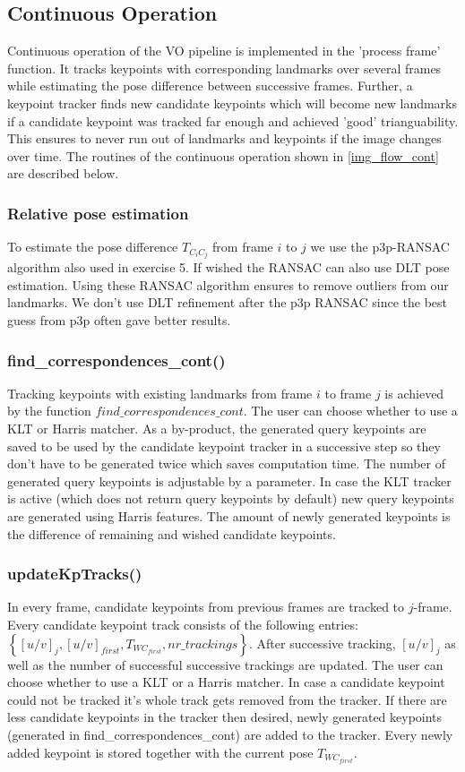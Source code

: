 \subsection{Continuous Operation}
\label{sec_cont_op}
Continuous operation of the VO pipeline is implemented in the 'process frame' function. It tracks keypoints with corresponding landmarks over several frames while estimating the pose difference between successive frames. Further, a keypoint tracker finds new candidate keypoints which will become new landmarks if a candidate keypoint was tracked far enough and achieved 'good' trianguability. This ensures to never run out of landmarks and keypoints if the image changes over time. The routines of the continuous operation shown in \cref{img_flow_cont} are described below.

\subsubsection{Relative pose estimation} \label{ransac_cont}
To estimate the pose difference $T_{C_iC_j}$ from frame $i$ to $j$ we use the p3p-RANSAC algorithm also used in exercise 5. If wished the RANSAC can also use DLT pose estimation. Using these RANSAC algorithm ensures to remove outliers from our landmarks. We don't use DLT refinement after the p3p RANSAC since the best guess from p3p often gave better results.

\subsubsection{find\_correspondences\_cont()}
Tracking keypoints with existing landmarks from frame $i$ to frame $j$ is achieved by the function $find\_correspondences\_cont$. The user can choose whether to use a KLT or Harris matcher. As a by-product, the generated query keypoints are saved to be used by the candidate keypoint tracker in a successive step so they don't have to be generated twice which saves computation time. The number of generated query keypoints is adjustable by a parameter. In case the KLT tracker is active (which does not return query keypoints by default) new query keypoints are generated using Harris features. The amount of newly generated keypoints is the difference of remaining and wished candidate keypoints.

\subsubsection{updateKpTracks()}
In every frame, candidate keypoints from previous frames are tracked to $j$-frame. Every candidate keypoint track consists of the following entries: $\left\{\left[u/v\right]_j, \left[u/v\right]_{first}, T_{WC_{first}}, nr\_trackings\right\}$. After successive tracking, $[u/v]_j$ as well as the number of successful successive trackings are updated. The user can choose whether to use a KLT or a Harris matcher.
In case a candidate keypoint could not be tracked it's whole track gets removed from the tracker. If there are less candidate keypoints in the tracker then desired, newly generated keypoints (generated in find\_correspondences\_cont) are added to the tracker. Every newly added keypoint is stored together with the current pose $T_{WC_{first}}$.

